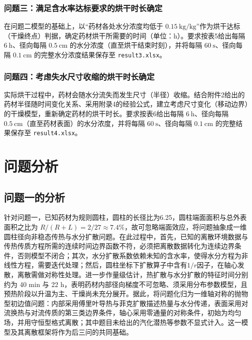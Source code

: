 \documentclass[12pt,a4paper]{article}
\begin{document}
\subsubsection{问题三：满足含水率达标要求的烘干时长确定}
在问题二模型的基础上，以“药材各处水分浓度均低于 $0.15\ \mathrm{kg/kg}$”作为烘干达标（干燥终点）判据，确定药材烘干所需要的时间（单位：$\mathrm{h}$）。要求按表5给出每隔 $6\ \mathrm{h}$、径向每隔 $0.5\ \mathrm{cm}$ 的水分浓度（直至烘干结束时刻），并将每隔 $60\ \mathrm{s}$、径向每隔 $0.1\ \mathrm{cm}$ 的完整水分浓度结果保存至 \texttt{result3.xlsx}。

\subsubsection{问题四：考虑失水尺寸收缩的烘干时长确定}
实际烘干过程中，药材会随水分流失而发生尺寸（半径）收缩。结合附件2给出的药材半径随时间变化关系、采用附录4的经验公式，建立考虑尺寸变化（移动边界）的干燥模型，重新确定药材的烘干时长。要求按表6给出每隔 $6\ \mathrm{h}$、径向每隔 $0.5\ \mathrm{cm}$（直至药材表面）的水分浓度，并将每隔 $60\ \mathrm{s}$、径向每隔 $0.1\ \mathrm{cm}$ 的完整结果保存至 \texttt{result4.xlsx}。


\section{问题分析}
\subsection{问题一的分析}
针对问题一，已知药材为规则圆柱，圆柱的长径比为6.25，圆柱端面面积与总外表面积之比为 $R/(R+L)=2/27\approx7.4\%$，故可忽略端面效应，将问题抽象成一维圆柱径向非稳态传热与水分扩散问题。在此过程中，首先，已知的离散环境数据与传热传质方程所需的连续时间边界函数不符，必须把离散数据转化为连续边界条件，否则模型不闭合；其次，水分扩散系数依赖未知的含水率，使得水分方程为非线性方程，需要迭代处理；然后，圆柱坐标下扩散算子中含有$1/r$因子，在轴心发散，离散需做对称性处理。进一步作量级估计，热扩散与水分扩散的特征时间分别约为 40 min 与 22 h，表明药材内部径向梯度不可忽略、须采用分布参数模型，且预热阶段以升温为主、干燥尚未充分展开。据此，将问题化归为一维轴对称的抛物型初边值问题：内部采用傅里叶导热与菲克扩散描述热量与水分传递，表面采用对流换热与对流传质的第三类边界条件，轴心采用零通量的对称条件，初始为均匀场，并用守恒型格式离散；其中题目未给出的汽化潜热等参数不显式计入。这一模型及其离散框架将作为后三问的共同基础。
\end{document}
